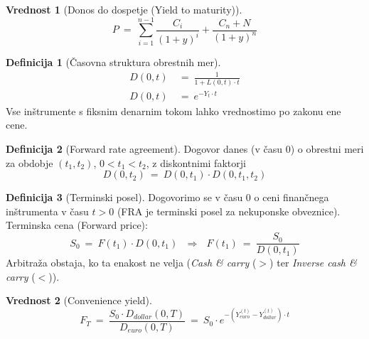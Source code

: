 \documentclass[11pt]{article}
\newcommand{\1}{\mathbbm{1}}
\theoremstyle{definition}
\newtheorem{definicija}{Definicija}[section]
\theoremstyle{definition}
\newtheorem{vrednost}{Vrednost}
\begin{document}
\begin{vrednost}[Donos do dospetje (Yield to maturity)]

$$P ~=~ \sum_{i=1}^{n-1} \frac{C_i}{(1+y)^i} + \frac{C_n + N}{(1+y)^n}$$

\end{vrednost}
\vspace{0.5cm}

\begin{definicija}[Časovna struktura obrestnih mer]

\begin{align*}
D(0, t) ~&=~ \frac{1}{1 + L(0, t) \cdot t} \\
D(0, t) ~&=~ e^{-Y_t \cdot t}
\end{align*}
Vse inštrumente s fiksnim denarnim tokom lahko vrednostimo po zakonu ene cene.

\end{definicija}
\vspace{0.5cm}

\begin{definicija}[Forward rate agreement]

Dogovor danes (v času $0$) o obrestni meri za obdobje $(t_1, t_2)$, $0 < t_1 < t_2$, z diskontnimi faktorji
$$D(0, t_2) ~=~ D(0, t_1) \cdot D(0, t_1, t_2)$$

\end{definicija}
\vspace{0.5cm}

\begin{definicija}[Terminski posel]

Dogovorimo se v času $0$ o ceni finančnega inštrumenta v času $t>0$ (FRA je terminski posel za nekuponske obveznice). Terminska cena (Forward price):
$$S_0 ~=~ F(t_1) \cdot D(0, t_1) ~~~\Longrightarrow~~~ F(t_1) ~=~ \frac{S_0}{D(0, t_1)}$$
Arbitraža obstaja, ko ta enakost ne velja (\textit{Cash \& carry} ($>$) ter \textit{Inverse cash \& carry} ($<$)).

\end{definicija}
\vspace{0.5cm}

\begin{vrednost}[Convenience yield]

$$F_T ~=~ \frac{S_0 \cdot D_{dollar}(0, T)}{D_{euro}(0, T)} ~=~ S_0 \cdot e^{-\left( Y_{euro}^{(t)} - Y_{dollar}^{(t)} \right) \cdot t}$$

\end{vrednost}
\vspace{0.5cm}
\end{document}
